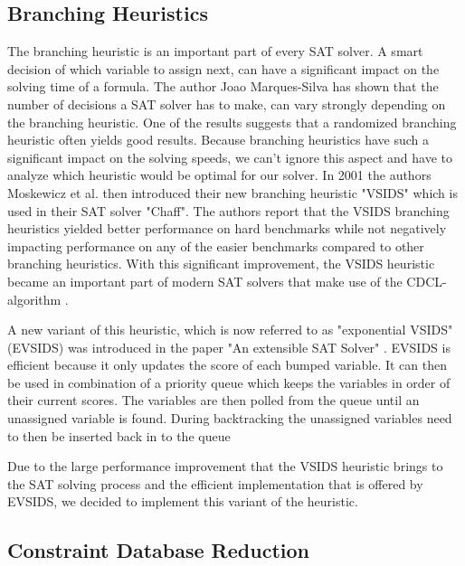 \subsection{Branching Heuristics}

The branching heuristic is an important part of every SAT solver. A smart decision of which variable to assign next, can have a significant impact on the solving time of a formula. The author Joao Marques-Silva \cite{marques1999impact} has shown that the number of decisions a SAT solver has to make, can vary strongly depending on the branching heuristic. One of the results suggests that a randomized branching heuristic often yields good results. Because branching heuristics have such a significant impact on the solving speeds, we can't ignore this aspect and have to analyze which heuristic would be optimal for our solver. In 2001 the authors Moskewicz et al. \cite{moskewicz2001chaff} then introduced their new branching heuristic "VSIDS" which is used in their SAT solver "Chaff". The authors report that the VSIDS branching heuristics yielded better performance on hard benchmarks while not negatively impacting performance on any of the easier benchmarks \cite{moskewicz2001chaff} compared to other branching heuristics. With this significant improvement, the VSIDS heuristic became an important part of modern SAT solvers that make use of the CDCL-algorithm \cite{biere2015evaluating}. 

A new variant of this heuristic, which is now referred to as "exponential VSIDS" (EVSIDS) \cite{biere2015evaluating} was introduced in the paper "An extensible SAT Solver" \cite{een2003extensible}. EVSIDS is efficient because it only updates the score of each bumped variable. It can then be used in combination of a priority queue which keeps the variables in order of their current scores. The variables are then polled from the queue until an unassigned variable is found. During backtracking the unassigned variables need to then be inserted back in to the queue \cite{biere2015evaluating}

Due to the large performance improvement that the VSIDS heuristic brings to the SAT solving process and the efficient implementation that is offered by EVSIDS, we decided to implement this variant of the heuristic.

\subsection{Constraint Database Reduction}

